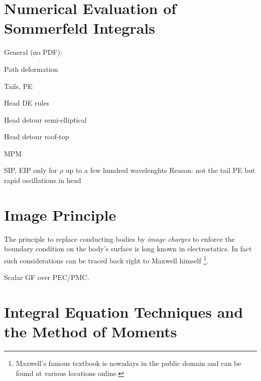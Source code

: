 
\cite{Weyl1919}









\section{Numerical Evaluation of Sommerfeld Integrals}

General (no PDF):
\cite{mosig1982}

Path deformation
\cite{Michalski1985a}

Tails, \ac{PE}
\cite{Michalski1998}
\cite{Mosig2012}
\cite{mosig2013}
\cite{Michalski2016a}
\cite{Golubovic2012}

Head DE rules
\cite{golubovicniciforovic2011}

Head detour semi-elliptical
\cite{GayBalmaz1997}

Head detour roof-top
\cite{Michalski2015a}

MPM
\cite{MengtaoYuan2006a}


\ac{SIP}, \ac{EIP} only for $\rho$ up to a few hundred wavelenghts \cite[14]{Michalski2016b}
Reason: not the tail \ac{PE} but rapid oscillations in head






\section{Image Principle}

The principle to replace conducting bodies by \emph{image charges} to enforce
the boundary condition on the body's surface is long known in electrostatics.
In fact such considerations can be traced back right to Maxwell himself
\cite[Chapter~XI]{maxwell1873}\footnote{Maxwell's famous textbook
\cite{maxwell1873} is nowadays in the public domain and can be found at various
locations online.}.

Scalar GF over PEC/PMC. \cite[p. 250]{Sommerfeld1964}

\cite{Lindell1984}
\cite{Lindell1984a}
\cite{Lindell1984b}
\cite{Lindell2000}







\section{Integral Equation Techniques and the Method of Moments}

